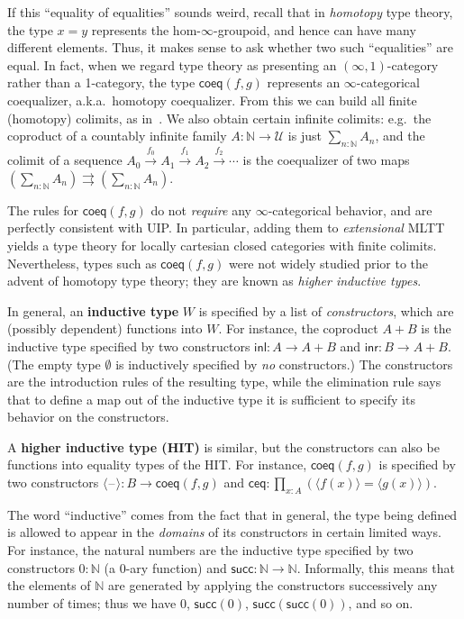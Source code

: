 \documentclass[10pt]{article}
\def\oo{\ensuremath{\infty}}
\def\io{\ensuremath{(\oo,1)}}
\def\N{\mathbb{N}}
\def\inl{\mathsf{inl}}
\def\inr{\mathsf{inr}}
\def\tprod{\textstyle\prod}
\def\U{\mathscr{U}}
\def\coeq{\mathsf{coeq}}
\def\classof#1{\langle #1\rangle}
\def\ceq{\mathsf{ceq}}
\newcommand{\blank}{\mathord{\hspace{1pt}\text{--}\hspace{1pt}}}
\def\succ{\mathsf{succ}}
\numberwithin{equation}{section}
\begin{document}
If this ``equality of equalities'' sounds weird, recall that in \emph{homotopy} type theory, the type $x=y$ represents the hom-$\oo$-groupoid, and hence can have many different elements.
Thus, it makes sense to ask whether two such ``equalities'' are equal.
In fact, when we regard type theory as presenting an $\io$-category rather than a 1-category, the type $\coeq(f,g)$ represents an $\oo$-categorical coequalizer, a.k.a.\ homotopy coequalizer.
From this we can build all finite (homotopy) colimits, as in~\cite[Corollary 4.4.2.4]{lurie:higher-topoi}.
We also obtain certain infinite colimits: e.g.\ the coproduct of a countably infinite family $A:\N\to\U$ is just $\sum_{n:\N} A_n$, and the co\-limit of a sequence $A_0 \xrightarrow{f_0} A_1 \xrightarrow{f_1} A_2 \xrightarrow{f_2} \cdots$ is the coequalizer of two maps $(\sum_{n:\N} A_n) \rightrightarrows (\sum_{n:\N} A_n)$.

The rules for $\coeq(f,g)$ do not \emph{require} any $\oo$-categorical behavior, and are perfectly consistent with UIP.
In particular, adding them to \emph{extensional} MLTT yields a type theory for locally cartesian closed categories with finite colimits.
Nevertheless, types such as $\coeq(f,g)$ were not widely studied prior to the advent of homotopy type theory;
they are known as \emph{higher inductive types}. %

In general, an \textbf{inductive type} $W$ is specified by a list of \emph{constructors}, which are (possibly dependent) functions into $W$.
For instance, the coproduct $A+B$ is the inductive type specified by two constructors $\inl : A \to A+B$ and $\inr : B \to A+B$.
(The empty type $\emptyset$ is inductively specified by \emph{no} constructors.)
The constructors are the introduction rules of the resulting type, while the elimination rule says that to define a map out of the inductive type it is sufficient to specify its behavior on the constructors.

A \textbf{higher inductive type (HIT)} is similar, but the constructors can also be functions into equality types of the HIT.
For instance, $\coeq(f,g)$ is specified by two constructors $\classof{\blank} : B\to \coeq(f,g)$ and $\ceq : \tprod_{x:A} (\classof{f(x)} = \classof{g(x)})$.

The word ``inductive'' comes from the fact that in general, the type being defined is allowed to appear in the \emph{domains} of its constructors in certain limited ways.
For instance, the natural numbers are the inductive type specified by two constructors $0:\N$ (a 0-ary function) and $\succ:\N\to\N$.
Informally, this means that the elements of $\N$ are generated by applying the constructors successively any number of times; thus we have $0$, $\succ(0)$, $\succ(\succ(0))$, and so on.
\end{document}
